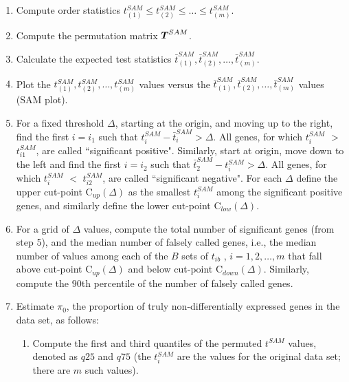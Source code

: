 \begin{enumerate}

\item Compute order statistics $t_{(1)}^{SAM} \le t_{(2)}^{SAM} \le
\dots \le t_{(m)}^{SAM}$.

\item Compute the permutation matrix $\mbox{\boldmath $T$}^{SAM}$.

\item Calculate the expected test statistics
$\bar{t}_{(1)}^{SAM},\bar{t}_{(2)}^{SAM},\dots,\bar{t}_{(m)}^{SAM}$.

\item Plot the $t_{(1)}^{SAM} , t_{(2)}^{SAM}, \dots , t_{(m)}^{SAM}$
values versus the
$\bar{t}_{(1)}^{SAM},\bar{t}_{(2)}^{SAM},\dots,\bar{t}_{(m)}^{SAM}$
values (SAM plot).

\item For a fixed threshold $\Delta$, starting at the origin, and
moving up to the right, find the first $i=i_1$ such that
$t_i^{SAM}-\bar{t}_{i}^{SAM} > \Delta$. All genes, for which
$t_i^{SAM}$ $>$ $t_{i1}^{SAM}$, are called ``significant positive".
Similarly, start at origin, move down to the left and find the first
$i=i_2$ such that $\bar{t}_{2}^{SAM}-t_i^{SAM}> \Delta$. All genes,
for which $t_i^{SAM}$ $<$ $t_{i2}^{SAM}$, are called ``significant
negative". For each $\Delta$ define the upper cut-point
C$_{up}(\Delta)$ as the smallest $t_i^{SAM}$ among the significant
positive genes, and similarly define the lower cut-point
C$_{low}(\Delta)$.

\item For a grid of $\Delta$ values, compute the total number of
significant genes (from step 5), and the median number of falsely
called genes, i.e., the median number of values among each of the
$B$ sets of $t_{ib}$ , $i=1,2,\dots,m$ that fall above cut-point
C$_{up}(\Delta)$ and below cut-point C$_{down}(\Delta)$.
Similarly, compute the $90$th percentile of the number of falsely
called genes.

\item Estimate $\pi_0$, the proportion of truly non-differentially
expressed genes in the data set, as follows:

\begin{enumerate}

\item Compute the first and third quantiles of the permuted
$t^{SAM}$ values, denoted as $q25$ and $q75$ (the $t_i^{SAM}$ are
the values for the original data set; there are $m$ such values).


\end{enumerate}
\end{enumerate}

